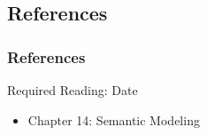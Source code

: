 \documentclass[dvipsnames]{beamer}
\begin{document}
\subsection*{References}

\begin{frame}
  \frametitle{References}

  \begin{block}{Required Reading: Date}
    \begin{itemize}
      \item Chapter 14: \alert{Semantic Modeling}
    \end{itemize}
  \end{block}
\end{frame}
\end{document}
